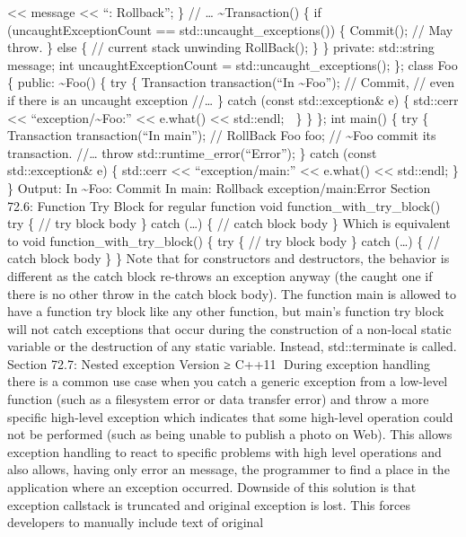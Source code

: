 \textless\textless{} message \textless\textless{} ``: Rollback\n''; \}
// \ldots{} \textasciitilde Transaction() \{ if (uncaughtExceptionCount
== std::uncaught\_exceptions()) \{ Commit(); // May throw. \} else \{ //
current stack unwinding RollBack(); \} \} private: std::string message;
int uncaughtExceptionCount = std::uncaught\_exceptions(); \}; class Foo
\{ public: \textasciitilde Foo() \{ try \{ Transaction transaction(``In
\textasciitilde Foo''); // Commit, // even if there is an uncaught
exception //\ldots{} \} catch (const std::exception\& e) \{ std::cerr
\textless\textless{} ``exception/\textasciitilde Foo:''
\textless\textless{} e.what() \textless\textless{} std::endl;  \} \}
\}; int main() \{ try \{ Transaction transaction(``In main''); //
RollBack Foo foo; // \textasciitilde Foo commit its transaction.
//\ldots{} throw std::runtime\_error(``Error''); \} catch (const
std::exception\& e) \{ std::cerr \textless\textless{}
``exception/main:'' \textless\textless{} e.what() \textless\textless{}
std::endl; \} \} Output: In \textasciitilde Foo: Commit In main:
Rollback exception/main:Error Section 72.6: Function Try Block for
regular function void function\_with\_try\_block() try \{ // try block
body \} catch (\ldots) \{ // catch block body \} Which is equivalent to
void function\_with\_try\_block() \{ try \{ // try block body \} catch
(\ldots) \{ // catch block body \} \} Note that for constructors and
destructors, the behavior is diﬀerent as the catch block re-throws an
exception anyway (the caught one if there is no other throw in the catch
block body). The function main is allowed to have a function try block
like any other function, but main's function try block will not catch
exceptions that occur during the construction of a non-local static
variable or the destruction of any static variable. Instead,
std::terminate is called. Section 72.7: Nested exception Version ≥ C++11
During exception handling there is a common use case when you catch a
generic exception from a low-level function (such as a ﬁlesystem error
or data transfer error) and throw a more speciﬁc high-level exception
which indicates that some high-level operation could not be performed
(such as being unable to publish a photo on Web). This allows exception
handling to react to speciﬁc problems with high level operations and
also allows, having only error an message, the programmer to ﬁnd a place
in the application where an exception occurred. Downside of this
solution is that exception callstack is truncated and original exception
is lost. This forces developers to manually include text of original
